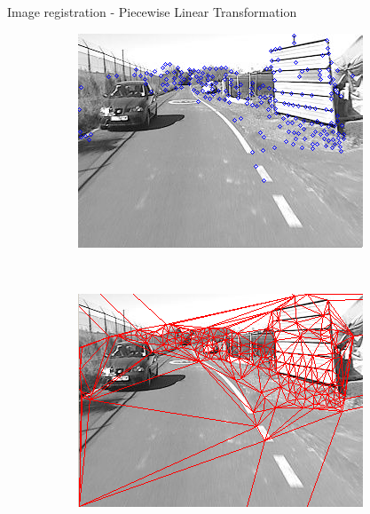\begin{frame}{Image registration - Piecewise Linear Transformation}
  \begin{figure}[h!]
    \centering
    \begin{subfigure}[b]{0.3\textwidth}
	    \includegraphics[width=\textwidth]{triangulation1}
    \end{subfigure}%
    ~
    \begin{subfigure}[b]{0.3\textwidth}
	    \includegraphics[width=\textwidth]{triangulation2}
    \end{subfigure}%
    \\~\\~
    \begin{subfigure}[b]{0.3\textwidth}

\end{subfigure}
\end{figure}
\end{frame}
